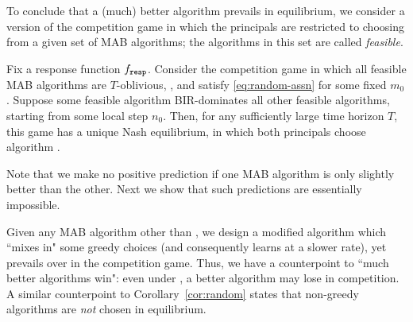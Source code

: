 
To conclude that a (much) better algorithm prevails in equilibrium, we consider a version of the competition game in which the principals are restricted to choosing from a given set of MAB algorithms; the algorithms in this set are called \emph{feasible}.


\begin{corollary}\label{cor:random}
Fix a \HardMaxRandom response function $f_{\mathtt{resp}}$. Consider the competition game in which all feasible MAB algorithms are $T$-oblivious, \bmonotone, and satisfy \eqref{eq:random-assn} for some fixed $m_0$. Suppose some feasible algorithm \alg  BIR-dominates all other feasible algorithms, starting from some local step $n_0$. Then, for any sufficiently large time horizon $T$, this game has a unique Nash equilibrium, in which both principals choose algorithm \alg.
\end{corollary}

Note that we make no positive prediction if one MAB algorithm is only slightly better than the other. Next we show that such predictions are essentially impossible.


Given any \bmonotone MAB algorithm \alg other than \DynGreedy, we design a modified algorithm which ``mixes in" some greedy choices (and consequently learns at a slower rate), yet prevails over \alg in the competition game. Thus, we have a counterpoint to ``much better algorithms win": even under \HardMaxRandom, a better algorithm may lose in competition. A similar counterpoint to Corollary~\ref{cor:random} states that non-greedy algorithms are \emph{not} chosen in equilibrium.

